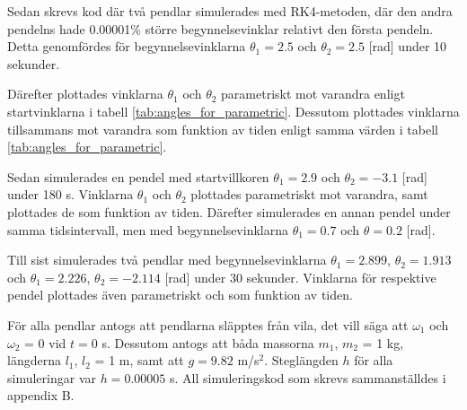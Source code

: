 Sedan skrevs kod där två pendlar simulerades med RK4-metoden, där den andra pendelns hade 0.00001\% större begynnelsevinklar relativt den första pendeln. Detta genomfördes för begynnelsevinklarna $\theta_1 = 2.5$ och $\theta_2 = 2.5$ [rad] under 10 sekunder.


Därefter plottades vinklarna $\theta_1$ och $\theta_2$ parametriskt mot varandra enligt startvinklarna i tabell \ref{tab:angles_for_parametric}. Dessutom plottades vinklarna tillsammans mot varandra som funktion av tiden enligt samma värden i tabell \ref{tab:angles_for_parametric}. 

Sedan simulerades en pendel med startvillkoren $\theta_1 = 2.9$ och $\theta_2 = -3.1$ [rad] under 180 s. Vinklarna $\theta_1$ och $\theta_2$ plottades parametriskt mot varandra, samt plottades de som funktion av tiden. Därefter simulerades en annan pendel under samma tidsintervall, men med begynnelsevinklarna $\theta_1 = 0.7$ och $\theta = 0.2$ [rad].

Till sist simulerades två pendlar med begynnelsevinklarna $\theta_1 = 2.899$, $\theta_2 = 1.913$ och $\theta_1 = 2.226$, $\theta_2 = -2.114$ [rad] under 30 sekunder. Vinklarna för respektive pendel plottades även parametriskt och som funktion av tiden. 


För alla pendlar antogs att pendlarna släpptes från vila, det vill säga att $\omega_1$ och $\omega_2$ = 0 vid $t=0$ s. Dessutom antogs att båda massorna $m_1$, $m_2$ = 1 kg, längderna $l_1$, $l_2$ = 1 m, samt att $g = 9.82$ m/s$^2$. Steglängden $h$ för alla simuleringar var $h = 0.00005$ s. All simuleringskod som skrevs sammanställdes i appendix B.


